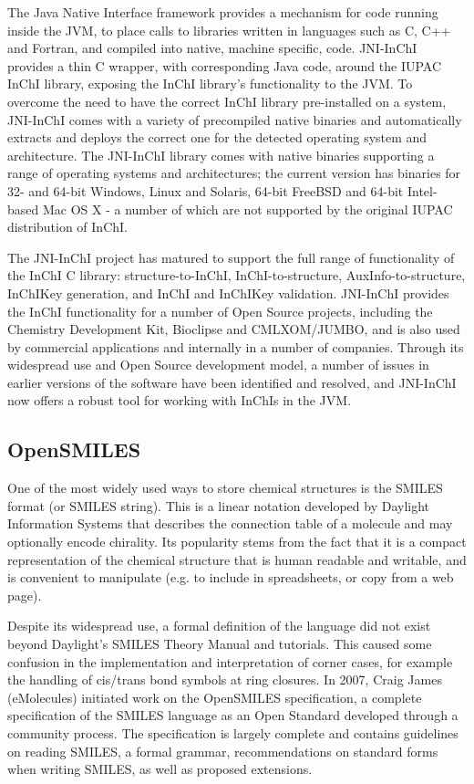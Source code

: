 \documentclass[10pt]{bmc_article}
\newenvironment{bmcformat}{\fussy\setboolean{publ}{true}}{\fussy}
\begin{document}
\begin{bmcformat}
The Java Native Interface framework provides a mechanism for code
running inside the JVM, to place calls to libraries written in languages
such as C, C++ and Fortran, and compiled into native, machine specific,
code. JNI-InChI provides a thin C wrapper, with corresponding Java code,
around the IUPAC InChI library, exposing the InChI library's functionality
to the JVM.  To overcome the need to have the correct InChI library pre-installed
on a system, JNI-InChI comes with a variety of precompiled native binaries and
automatically extracts and deploys the correct one for the detected operating
system and architecture. The JNI-InChI library comes with native binaries
supporting a range of operating systems and architectures; the current version
has binaries for 32- and 64-bit Windows, Linux and Solaris, 64-bit FreeBSD
and 64-bit Intel-based Mac OS X - a number of which are not supported by the
original IUPAC distribution of InChI.

The JNI-InChI project has matured to support the full range of
functionality of the InChI C library: structure-to-InChI, InChI-to-structure,
AuxInfo-to-structure, InChIKey generation, and InChI and InChIKey validation.
JNI-InChI provides the InChI functionality for a number of Open Source projects,
including the Chemistry Development Kit, Bioclipse and CMLXOM/JUMBO, and is
also used by commercial applications and internally in a number of companies.
Through its widespread use and Open Source development model, a number of
issues in earlier versions of the software have been identified and resolved,
and JNI-InChI now offers a robust tool for working with
InChIs in the JVM.


    \subsection*{OpenSMILES}

One of the most widely used ways to store chemical structures is the
SMILES format (or SMILES string). This is a linear notation developed
by Daylight Information Systems that describes the connection table
of a molecule and may optionally encode chirality. Its popularity
stems from the fact that it is a compact representation of the
chemical structure that is human readable and writable, and is
convenient to manipulate (e.g. to include in spreadsheets, or copy
from a web page).

Despite its widespread use, a formal
definition of the language did not exist beyond Daylight's SMILES
Theory Manual and tutorials. This caused some confusion in the
implementation and interpretation of corner cases, for example the
handling of cis/trans bond symbols at ring closures. In 2007, Craig
James (eMolecules) initiated work on the OpenSMILES specification, a
complete specification of the SMILES language as an Open Standard
developed through a community process. The specification is largely
complete and contains guidelines on reading SMILES, a formal
grammar, recommendations on standard forms when writing SMILES, as
well as proposed extensions.


\end{bmcformat}
\end{document}

